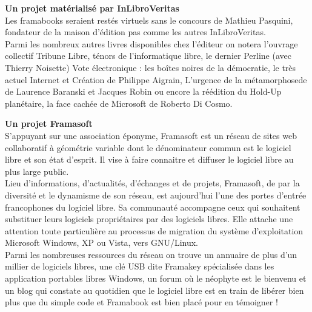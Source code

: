 {\textbf{Un projet matérialisé par InLibroVeritas}\\
Les framabooks seraient restés virtuels sans le concours de Mathieu Pasquini, fondateur de la maison d'édition pas comme les autres InLibroVeritas.\\
Parmi les nombreux autres livres disponibles chez l'éditeur on notera l'ouvrage collectif Tribune Libre, ténors de l'informatique libre, le dernier Perline (avec Thierry Noisette) Vote électronique : les boîtes noires de la démocratie, le très actuel Internet et Création de Philippe Aigrain, L'urgence de la métamorphosede de Laurence Baranski et Jacques Robin ou encore la réédition du Hold-Up planétaire, la face cachée de Microsoft de Roberto Di Cosmo.\par
\textbf{Un projet Framasoft}\\
S'appuyant sur une association éponyme, Framasoft est un réseau de sites web collaboratif à géométrie variable dont le dénominateur commun est le logiciel libre et son état d'esprit. Il vise à faire connaitre et diffuser le logiciel libre au plus large public.\\
Lieu d'informations, d'actualités, d'échanges et de projets, Framasoft, de par la diversité et le dynamisme de son réseau, est aujourd'hui l'une des portes d'entrée francophones du logiciel libre. Sa communauté accompagne ceux qui souhaitent substituer leurs logiciels propriétaires par des logiciels libres. Elle attache une attention toute particulière au processus de migration du système d'exploitation Microsoft Windows, XP ou Vista, vers GNU/Linux.\\
Parmi les nombreuses ressources du réseau on trouve un annuaire de plus d'un millier de logiciels libres, une clé USB dite Framakey spécialisée dans les application portables libres Windows, un forum où le néophyte est le bienvenu et un blog qui constate au quotidien que le logiciel libre est en train de libérer bien plus que du simple code et Framabook est bien placé pour en témoigner !
}
